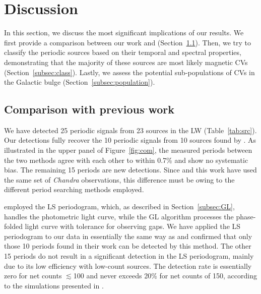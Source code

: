 \documentclass[fleqn,usenatbib]{mnras}
\begin{document}
\section{Discussion}\label{sec:discussion}
In this section, we discuss the most significant implications of our results. We first provide a comparison between our work and \cite{2012ApJ...746..165H} (Section~\ref{subsec:compare}). Then, we try to classify the periodic sources based on their temporal and spectral properties, demonstrating that the majority of these sources are most likely magnetic CVs (Section~\ref{subsec:class}). Lastly, we assess the potential sub-populations of CVs in the Galactic bulge (Section~\ref{subsec:population}).

\subsection{Comparison with previous work} \label{subsec:compare}
We have detected 25 periodic signals from 23 sources in the LW (Table~\ref{tab:src}). 
Our detections fully recover the 10 periodic signals from 10 sources found by \cite{2012ApJ...746..165H}. 
As illustrated in the upper panel of Figure~\ref{fig:com}, the measured periods between the two methods agree with each other to within 0.7\% and show no systematic bias.
The remaining 15 periods are new detections. 
Since \cite{2012ApJ...746..165H} and this work have used the same set of {\it Chandra} observations, 
this difference must be owing to the different period searching methods employed.

\cite{2012ApJ...746..165H} employed the LS periodogram,
which, as described in Section~\ref{subsec:GL}, handles the photometric light curve, while the GL algorithm processes the phase-folded light curve with tolerance for observing gaps. We have applied the LS periodogram to our data in essentially the same way as \cite{2012ApJ...746..165H} and confirmed that only those 10 periods found in their work can be detected by this method. 
The other 15 periods do not result in a significant detection in the LS periodogram, mainly due to its low efficiency with low-count sources.
The detection rate is essentially zero for net counts $\lesssim$100 and never exceeds 20\% for net counts of 150, according to the simulations presented in \citet[figure 7 therein]{2012ApJ...746..165H}.
\end{document}
